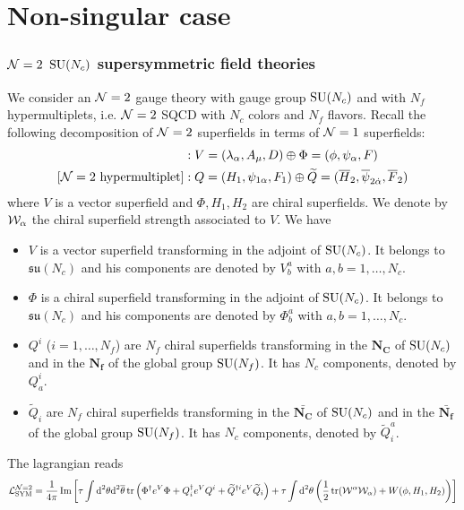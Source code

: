 \part{Non-singular case}

\section{$\mathcal{N}=2$ $\text{SU}(N_c)$ supersymmetric field theories}

    We consider an $\mathcal{N}=2$ gauge theory with gauge group $\text{SU}(N_c)$ and with $N_f$ hypermultiplets, i.e. $\mathcal{N}=2$ SQCD with $N_c$ colors and $N_f$ flavors. Recall the following decomposition of $\mathcal{N}=2$ superfields in terms of $\mathcal{N}=1$ superfields:
    \begin{align}
        [\mN=2 \text{ vector multiplet}] &: V=(\lambda_\alpha,A_\mu,D)\oplus \Phi=(\phi,\psi_\alpha,F)\\
        [\mN=2 \text{ hypermultiplet}] &: Q=(H_1,\psi_{1\alpha},F_1) \oplus \tilde{Q}=(\bar{H}_2,\bar{\psi}_{2\dalpha},\bar{F}_2)
    \end{align}
    where $V$ is a vector superfield and $\Phi,H_1,H_2$ are chiral superfields. We denote by $\mathcal{W}_\alpha$ the chiral superfield strength associated to $V$. We have
    \begin{itemize}
        \item $V$ is a vector superfield transforming in the adjoint of $\text{SU}(N_c)$. It belongs to $\mathfrak{su}(N_c)$ and his components are denoted by $V^a_b$ with $a,b=1,\dots,N_c$.
        \item $\Phi$ is a chiral superfield transforming in the adjoint of $\text{SU}(N_c)$. It belongs to $\mathfrak{su}(N_c)$ and his components are denoted by $\Phi^a_b$ with $a,b=1,\dots,N_c$.
        \item $Q^i$ ($i=1,\dots,N_f$) are $N_f$ chiral superfields transforming in the $\boldsymbol{N_C}$ of $\text{SU}(N_c)$ and in the $\boldsymbol{N_f}$ of the global group $\text{SU}(N_f)$. It has $N_c$ components, denoted by $Q^i_a$.
        \item $\tilde{Q}_i$ are $N_f$ chiral superfields transforming in the $\bar{\boldsymbol{N_C}}$ of $\text{SU}(N_c)$ and in the $\bar{\boldsymbol{N_f}}$ of the global group $\text{SU}(N_f)$. It has $N_c$ components, denoted by $\tilde{Q}^a_i$.
    \end{itemize}
    The lagrangian reads
    \begin{equation}
        \mathcal{L}^{\mathcal{N}=2}_{\text{SYM}} = \frac{1}{4\pi}\Im\left[\tau\int\text{d}^2\theta\text{d}^2\overline{\theta}\tr\left(\Phi^\dagger e^V\Phi + Q^\dagger_i e^V Q^i + \widetilde{Q}^{\dagger i}e^V \widetilde{Q}_i\right)+\tau\int\text{d}^2\theta\left(\frac{1}{2}\tr(\mathcal{W}^\alpha\mathcal{W}_\alpha)+W(\phi,H_1,H_2)\right)\right]\label{eq:lag}
    \end{equation}
